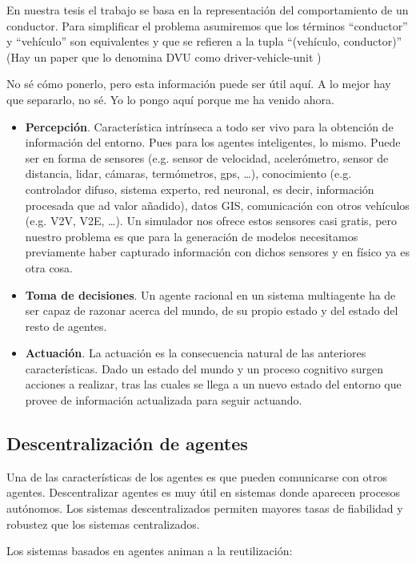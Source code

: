 En nuestra tesis el trabajo se basa en la representación del comportamiento de un conductor. Para simplificar el problema asumiremos que los términos \enquote{conductor} y \enquote{vehículo} son equivalentes y que se refieren a la tupla \enquote{(vehículo, conductor)} (Hay un paper que lo denomina DVU como driver-vehicle-unit \cite{Dia2002})

No sé cómo ponerlo, pero esta información puede ser útil aquí. A lo mejor hay que separarlo, no sé. Yo lo pongo aquí porque me ha venido ahora.

\begin{itemize}
	\item \textbf{Percepción}. Característica intrínseca a todo ser vivo para la obtención de información del entorno. Pues para los agentes inteligentes, lo mismo. Puede ser en forma de sensores (e.g. sensor de velocidad, acelerómetro, sensor de distancia, lidar, cámaras, termómetros, gps, \ldots), conocimiento (e.g. controlador difuso, sistema experto, red neuronal, es decir, información procesada que ad valor añadido), datos GIS, comunicación con otros vehículos (e.g. V2V, V2E, \ldots). Un simulador nos ofrece estos sensores casi gratis, pero nuestro problema es que para la generación de modelos necesitamos previamente haber capturado información con dichos sensores y en físico ya es otra cosa.
	\item \textbf{Toma de decisiones}. Un agente racional en un sistema multiagente ha de ser capaz de razonar acerca del mundo, de su propio estado y del estado del resto de agentes.
	\item \textbf{Actuación}. La actuación es la consecuencia natural de las anteriores características. Dado un estado del mundo y un proceso cognitivo surgen acciones a realizar, tras las cuales se llega a un nuevo estado del entorno que provee de información actualizada para seguir actuando.
\end{itemize}

\subsection{Descentralización de agentes}

Una de las características de los agentes es que pueden comunicarse con otros agentes. Descentralizar agentes es muy útil en sistemas donde aparecen procesos autónomos. Los sistemas descentralizados permiten mayores tasas de fiabilidad y robustez que los sistemas centralizados.

Los sistemas basados en agentes animan a la reutilización:


